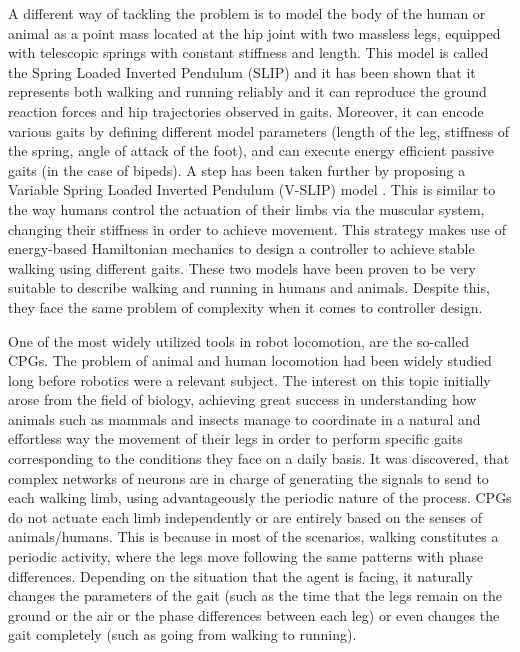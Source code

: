 \documentclass[../main.tex]{subfiles}
\begin{document}
	A different way of tackling the problem is to model the body of the human or animal as a point mass located at the hip joint with two massless legs, equipped with telescopic springs with constant stiffness and length. This model is called the Spring Loaded Inverted Pendulum (SLIP) and it has been shown that it represents both walking and running reliably \cite{Geyer2006} and it can reproduce the ground reaction forces and hip trajectories observed in gaits. Moreover, it can encode various gaits by defining different model parameters (length of the leg, stiffness of the spring, angle of attack of the foot), and can execute energy efficient passive gaits (in the case of bipeds).  A step has been taken further by proposing a Variable Spring Loaded Inverted Pendulum (V-SLIP) model \cite{Ketelaar}. This is similar to the way humans control the actuation of their limbs via the muscular system, changing their stiffness in order to achieve movement. This strategy makes use of energy-based Hamiltonian mechanics to design a controller to achieve stable walking using different gaits. These two models have been proven to be very suitable to describe walking and running in humans and animals. Despite this, they face the same problem of complexity when it comes to controller design.
	
	One of the most widely utilized tools in robot locomotion, are the so-called CPGs. The problem of animal and human locomotion had been widely studied long before robotics were a relevant subject. The interest on this topic initially arose from the field of biology, achieving great success in understanding how animals such as mammals and insects manage to coordinate in a natural and effortless way the movement of their legs in order to perform specific gaits corresponding to the conditions they face on a daily basis. It was discovered, that complex networks of neurons are in charge of generating the signals to send to each walking limb, using advantageously the periodic nature of the process. CPGs do not actuate each limb independently or are entirely based on the senses of animals/humans. This is because in most of the scenarios, walking constitutes a periodic activity, where the legs move following the same patterns with phase differences. Depending on the situation that the agent is facing, it naturally changes the parameters of the gait (such as the time that the legs remain on the ground or the air or the phase differences between each leg) or even changes the gait completely (such as going from walking to running).
	
\end{document}

